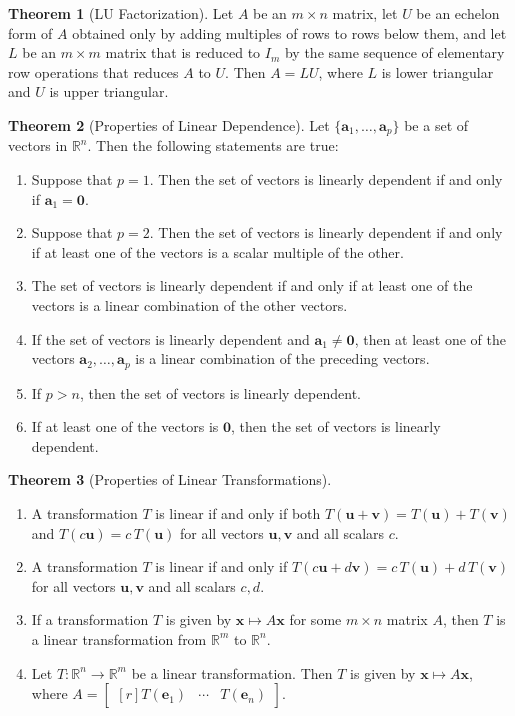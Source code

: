 \documentclass{myart}
\renewcommand{\vec}[1]{\ensuremath{\mathbf{#1}}}
\newcommand{\mat}[1]{\ensuremath{#1}}
\newcommand{\R}[1][]{\ensuremath{\mathbb{R}^{#1}}}
\newcommand{\by}{\ensuremath{\times}}
\newcommand{\MAT}[2][r]{\ensuremath{\begin{bmatrix*}[#1]#2\end{bmatrix*}}}
\newcommand{\set}[1]{\ensuremath{\{#1\}}}
\newcommand{\many}[2][n]{\ensuremath{{#2}_1, \ldots, {#2}_{#1}}}
\theoremstyle{definition}
\newtheorem{thm}{Theorem}
\begin{document}
\begin{thm}[LU Factorization]
  Let \mat A be an $m \by n$ matrix, let \mat U be an echelon form of
  \mat A obtained only by adding multiples of rows to rows below them,
  and let \mat L be an $m \by m$ matrix that is reduced to $\mat I_m$
  by the same sequence of elementary row operations that reduces \mat
  A to \mat U. Then $\mat A = \mat L \mat U$, where \mat L is lower
  triangular and \mat U is upper triangular.
\end{thm}

\begin{thm}[Properties of Linear Dependence]
  Let \set{\many[p]{\vec a}} be a set of vectors in \R[n]. Then the
  following statements are true:
  \begin{enumerate}
  \item Suppose that $p = 1$. Then the set of vectors is linearly
    dependent if and only if $\vec a_1 = \vec 0$.
  \item Suppose that $p = 2$. Then the set of vectors is linearly
    dependent if and only if at least one of the vectors is a scalar
    multiple of the other.
  \item The set of vectors is linearly dependent if and only if at
    least one of the vectors is a linear combination of the other
    vectors.
  \item If the set of vectors is linearly dependent and $\vec a_1 \neq
    \vec 0$, then at least one of the vectors $\vec a_2, \ldots, \vec
    a_p$ is a linear combination of the preceding vectors.
  \item If $p > n$, then the set of vectors is linearly dependent.
  \item If at least one of the vectors is \vec 0, then the set of
    vectors is linearly dependent.
  \end{enumerate}
\end{thm}

\begin{thm}[Properties of Linear Transformations] \hfill
  \begin{enumerate}
  \item A transformation $T$ is linear if and only if both $T(\vec u +
    \vec v) = T(\vec u) + T(\vec v)$ and $T(c \vec u) = c\, T(\vec u)$
    for all vectors $\vec u, \vec v$ and all scalars $c$.
  \item A transformation $T$ is linear if and only if $T(c\vec u +
    d\vec v) = c\,T(\vec u) + d\,T(\vec v)$ for all vectors $\vec u,
    \vec v$ and all scalars $c, d$.
  \item If a transformation $T$ is given by $\vec x \mapsto \mat A\vec
    x$ for some $m \by n$ matrix \mat A, then $T$ is a linear
    transformation from \R[m] to \R[n].
  \item Let $T : \R[n] \to \R[m]$ be a linear transformation. Then $T$
    is given by $\vec x \mapsto \mat A \vec x$, where $\mat A = \MAT{
      T(\vec e_1) & \cdots & T(\vec e_n) }$.
  \end{enumerate}
\end{thm}
\end{document}
